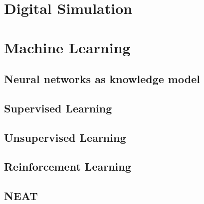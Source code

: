 \section{Digital Simulation}

\section{Machine Learning}
\subsection{Neural networks as knowledge model}
\subsection{Supervised Learning}
\subsection{Unsupervised Learning}
\subsection{Reinforcement Learning}


\subsection{NEAT}
